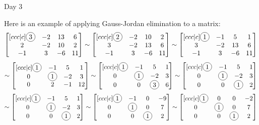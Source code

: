 \begin{applicationActivities}{Day 3}
\begin{observation}
  Here is an example of applying Gauss-Jordan elimination to a matrix:
  \[
    \begin{bmatrix}[ccc|c]
      \circledNumber{3} & -2 & 13 & 6 \\
      2 & -2 & 10 & 2 \\
      -1 & 3 & -6 & 11
    \end{bmatrix}\sim
    \begin{bmatrix}[ccc|c]
     \circledNumber{2} & -2 & 10 & 2 \\
      3 & -2 & 13 & 6 \\
      -1 & 3 & -6 & 11
    \end{bmatrix}\sim
    \begin{bmatrix}[ccc|c]
     \circledNumber{1} & -1 & 5 & 1 \\
      3 & -2 & 13 & 6 \\
      -1 & 3 & -6 & 11
    \end{bmatrix}
  \]
  \[\sim
    \begin{bmatrix}[ccc|c]
     \circledNumber{1} & -1 & 5 & 1 \\
      0 & \circledNumber{1} & -2 & 3 \\
      0 & 2 & -1 & 12
    \end{bmatrix}
    \sim
      \begin{bmatrix}[ccc|c]
       \circledNumber{1} & -1 & 5 & 1 \\
        0 & \circledNumber{1} & -2 & 3 \\
        0 & 0 & \circledNumber{3} & 6
      \end{bmatrix}
    \sim
    \begin{bmatrix}[ccc|c]
     \circledNumber{1} & -1 & 5 & 1 \\
      0 & \circledNumber{1} & -2 & 3 \\
      0 & 0 & \circledNumber{1} & 2
    \end{bmatrix}
  \]
  \[\sim
    \begin{bmatrix}[ccc|c]
     \circledNumber{1} & -1 & 5 & 1 \\
      0 & \circledNumber{1} & -2 & 3 \\
      0 & 0 & \circledNumber{1} & 2
    \end{bmatrix}
    \sim
    \begin{bmatrix}[ccc|c]
     \circledNumber{1} & -1 & 0 & -9 \\
      0 & \circledNumber{1} & 0 & 7 \\
      0 & 0 & \circledNumber{1} & 2
    \end{bmatrix}
    \sim
    \begin{bmatrix}[ccc|c]
     \circledNumber{1} & 0 & 0 & -2 \\
      0 & \circledNumber{1} & 0 & 7 \\
      0 & 0 & \circledNumber{1} & 2
    \end{bmatrix}
  \]
\end{observation}


\end{applicationActivities}
